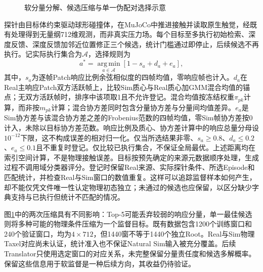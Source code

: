 \begin{figure}[htbp]
 \centering
 \caption{软分量分解、候选压缩与单一伪配对选择示意}
 \label{fig:ch05_gmm_candidate_selection}
\end{figure}

探针由目标体约束驱动球形碰撞体，在MuJoCo中推进接触并读取原生触觉，经既有处理得到无量纲712维观测，而非真实压力场。每个目标至多执行初始检索、深度反馈、深度反馈加邻近位置修正三个候选，统计门槛通过即停止，后续候选不再执行。记实际执行集合为$\mathcal A$，选择规则为
\begin{equation}
 a^*=\operatorname*{arg\,min}_{a\in\mathcal A}
 \left[1-s_a+d_a+e_a\right],
 \label{eq:ch05_pair_selection}
\end{equation}
其中，$s_a$为逐帧Patch响应比例余弦相似度的四帧均值，零响应帧也计入。$d_a$在Real主响应Patch双方活跃帧上，比较Sim质心与Real质心加GMM混合均值的锚点；无双方活跃帧时，排序中该项取1且不允许登记。混合均值按冻结权重$\pi_{pk}$计算，而非按$m_{pk}$计算；混合协方差同时包含分量协方差与分量间均值差异。$e_a$是Sim协方差与该混合协方差之差的Frobenius范数的四帧均值，零Sim帧协方差按0计入，未除以目标协方差范数。响应比例及质心、协方差计算中的响应总量分母设$10^{-12}$下限，这不构成误差的相对归一化。仅当所选结果非零、$s_a\ge0.8$、$d_a\le0.2$、$e_a\le0.1$且不重复时登记。仅比较已执行集合，不保证全局最优。上述距离均在索引空间计算，不是物理接触误差。目标按预先确定的来源元数据顺序处理，生成过程不调用域分类器评分。登记时保留Real来源、实际探针条件、所选Episode和匹配统计，并检查Real与Sim窗口的数值重复。这样可以追踪监督样本如何产生，却不能仅凭文件唯一性认定物理初态独立；未通过的候选也应保留，以区分缺少字典支持与已执行但统计不匹配的情况。

图\ref{fig:ch05_gmm_candidate_selection}中的两次压缩具有不同影响：Top-5可能丢弃较弱的响应分量，单一最佳候选则将多种可能的物理条件压缩为一个监督目标。既有数据包含1200个训练窗口和240个验证窗口，均为$4\times712$，但1440窗不等于1440个独立Root。Real与Sim物理Taxel对应尚未认证，统计准入也不保证Natural Sim输入被充分覆盖。后续Translator只使用选定窗口的对应关系，未完整保留分量责任度和候选多解概率。保留这些信息用于软监督是一种后续方向，其收益仍待验证。
